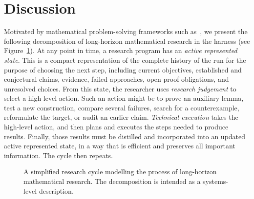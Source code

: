 \section{Discussion}
\label{sec:ai-discussion}
Motivated by mathematical problem-solving frameworks such as~\cite{carlson2005problemsolving, schoenfeld1983episodes}, we present the following decomposition of long-horizon mathematical
research in the harness (see Figure~\ref{fig:research-cycle}). At any point in time, a research program has an \emph{active represented state}. This is a compact representation of the complete history of the run for the purpose of choosing the next step, including current objectives, established and conjectural claims, evidence, failed approaches, open proof obligations, and unresolved choices. From this state, the
researcher uses \emph{research judgement} to select a high-level action. Such
an action might be to prove an auxiliary lemma, test a new construction,
compare several failures, search for a counterexample, reformulate the target,
or audit an earlier claim. \emph{Technical execution} takes the high-level action, and then plans and executes the steps needed to produce results. Finally, those results must be distilled and incorporated into
an updated active represented state, in a way that is efficient and preserves all important information. The cycle then repeats.

\begin{figure}[t]
  \centering
  \caption{A simplified research cycle modelling the process of long-horizon
  mathematical research. The decomposition is intended as a systems-level
  description.}
  \label{fig:research-cycle}
\end{figure}

